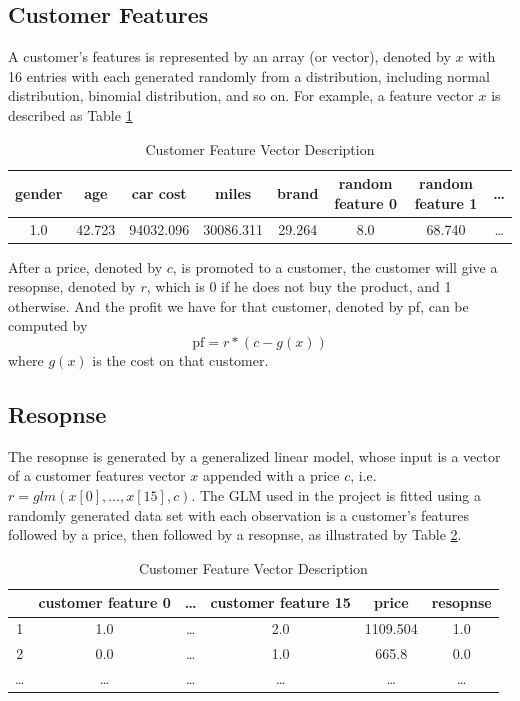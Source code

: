 \documentclass[balance,upint,subscriptcorrection,varvw,mathalfa=cal=boondoxo,pdf-a,colorlinks,nofoot]{asmeconf}
\begin{document}
\subsection{Customer Features}
\noindent A customer's features is represented by an array (or vector), denoted 
by \(x\) with 16 entries with each generated randomly from a distribution, 
including normal distribution, binomial distribution, and so on. For example, 
a feature vector \(x\) is described as Table \ref{tab:1}
\begin{table}
    \caption[Table]{Customer Feature Vector Description\label{tab:1}}
    \centering
    \begin{tabular}{c|c|c|c|c|c|c|c}
        gender & age & car cost & miles & brand & random feature 0 & random 
        feature 1 & \dots\\
        \hline
        1.0 & 42.723 & 94032.096 & 30086.311 & 29.264 & 8.0 & 68.740 & \dots
    \end{tabular}
\end{table}

\noindent After a price, denoted by \(c\), is promoted to a customer, the 
customer will give a resopnse, denoted by \(r\), which is 0 if he does not buy
the product, and 1 otherwise. And the profit we have for that customer, 
denoted by pf, can be computed by
\[\text{pf} = r*\left(c - g(x)\right)\]
where \(g(x)\) is the cost on that customer.

\subsection{Resopnse}
\noindent The resopnse is generated by a generalized linear model, whose input 
is a vector of a customer features vector \(x\) appended with a price \(c\), 
i.e. \(r=glm(x[0], \dots, x[15], c)\).
\vspace{3mm}\newline The GLM used in the project is fitted using a randomly
generated data set with each observation is a customer's features followed by 
a price, then followed by a resopnse, as illustrated by Table \ref{tab:2}.
\begin{table}
    \caption[Table]{Customer Feature Vector Description\label{tab:2}}
    \centering
    \begin{tabular}{c|c|c|c|c|c}
        & customer feature 0 & \dots & customer feature 15 & price & resopnse\\
        \hline
        1 & 1.0 & \dots & 2.0 & 1109.504 & 1.0\\
        \hline
        2 & 0.0 & \dots & 1.0 & 665.8 & 0.0\\
        \hline
        \dots & \dots & \dots & \dots & \dots & \dots
    \end{tabular}
\end{table}
\end{document}
